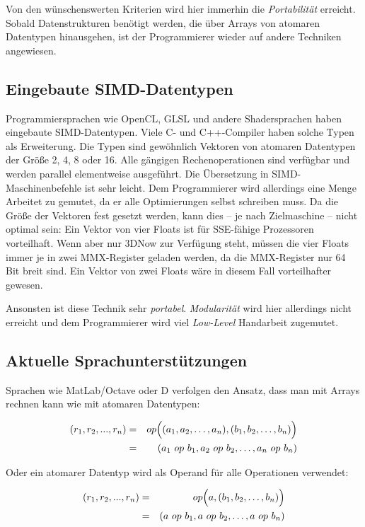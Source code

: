 \documentclass[a4paper,10pt]{article}
\begin{document}
Von den wünschenswerten Kriterien wird hier immerhin die \emph{Portabilität} erreicht. Sobald
Datenstrukturen benötigt werden, die über Arrays von atomaren Datentypen hinausgehen, ist der
Programmierer wieder auf andere Techniken angewiesen.

\subsection{Eingebaute SIMD-Datentypen}

Programmiersprachen wie OpenCL, GLSL und andere Shadersprachen haben eingebaute SIMD-Datentypen.
Viele C- und C++-Compiler haben solche Typen als Erweiterung. Die Typen sind gewöhnlich Vektoren von
atomaren Datentypen der Größe 2, 4, 8 oder 16. Alle gängigen Rechenoperationen sind verfügbar und
werden parallel elementweise ausgeführt. Die Übersetzung in SIMD-Maschinenbefehle ist sehr leicht.
Dem Programmierer wird allerdings eine Menge Arbeitet zu gemutet, da er alle Optimierungen selbst
schreiben muss. Da die Größe der Vektoren fest gesetzt werden, kann dies -- je nach Zielmaschine --
nicht optimal sein: Ein Vektor von vier Floats ist für SSE-fähige Prozessoren vorteilhaft. Wenn aber
nur 3DNow zur Verfügung steht, müssen die vier Floats immer je in zwei MMX-Register geladen werden,
da die MMX-Register nur 64 Bit breit sind. Ein Vektor von zwei Floats wäre in diesem Fall
vorteilhafter gewesen.

Ansonsten ist diese Technik sehr \emph{portabel}. \emph{Modularität} wird hier allerdings nicht
erreicht und dem Programmierer wird viel \emph{Low-Level} Handarbeit zugemutet.


\subsection{Aktuelle Sprachunterstützungen}

Sprachen wie MatLab/Octave oder D verfolgen den Ansatz, dass man mit Arrays rechnen kann wie mit
atomaren Datentypen:

\begin{eqnarray*}
    (r_1, r_2, ..., r_n)    & = & op\Bigl( (a_1, a_2, \dots, a_n), (b_1, b_2, \dots, b_n) \Bigr)\\ 
                            & = & (a_1 \ op \ b_1, a_2 \ op \ b_2, \dots, a_n \ op \ b_n)
\end{eqnarray*}

Oder ein atomarer Datentyp wird als Operand für alle Operationen verwendet:

\begin{eqnarray*}
    (r_1, r_2, ..., r_n)    & = & op\Bigl( a, (b_1, b_2, \dots, b_n) \Bigr)\\ 
                            & = & (a \ op \ b_1, a \ op \ b_2, \dots, a \ op \ b_n)
\end{eqnarray*}
\end{document}
